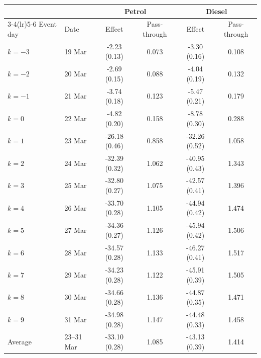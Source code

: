 \begin{tabular}{llcccc}
\toprule
 & & \multicolumn{2}{c}{Petrol} & \multicolumn{2}{c}{Diesel} \\
\cmidrule(lr){3-4}\cmidrule(lr){5-6}
Event day & Date & Effect & Pass-through & Effect & Pass-through \\
\midrule
\(k = -3\) & 19 Mar &  -2.23 (0.13) & 0.073 &  -3.30 (0.16) & 0.108 \\
\(k = -2\) & 20 Mar &  -2.69 (0.15) & 0.088 &  -4.04 (0.19) & 0.132 \\
\(k = -1\) & 21 Mar &  -3.74 (0.18) & 0.123 &  -5.47 (0.21) & 0.179 \\
\(k = 0\) & 22 Mar &  -4.82 (0.20) & 0.158 &  -8.78 (0.30) & 0.288 \\
\(k = 1\) & 23 Mar & -26.18 (0.46) & 0.858 & -32.26 (0.52) & 1.058 \\
\(k = 2\) & 24 Mar & -32.39 (0.32) & 1.062 & -40.95 (0.43) & 1.343 \\
\(k = 3\) & 25 Mar & -32.80 (0.27) & 1.075 & -42.57 (0.41) & 1.396 \\
\(k = 4\) & 26 Mar & -33.70 (0.28) & 1.105 & -44.94 (0.42) & 1.474 \\
\(k = 5\) & 27 Mar & -34.36 (0.27) & 1.126 & -45.94 (0.42) & 1.506 \\
\(k = 6\) & 28 Mar & -34.57 (0.28) & 1.133 & -46.27 (0.41) & 1.517 \\
\(k = 7\) & 29 Mar & -34.23 (0.28) & 1.122 & -45.91 (0.39) & 1.505 \\
\(k = 8\) & 30 Mar & -34.66 (0.28) & 1.136 & -44.87 (0.35) & 1.471 \\
\(k = 9\) & 31 Mar & -34.98 (0.28) & 1.147 & -44.48 (0.33) & 1.458 \\
\addlinespace
Average & 23--31 Mar & -33.10 (0.28) & 1.085 & -43.13 (0.39) & 1.414 \\
\bottomrule
\end{tabular}
